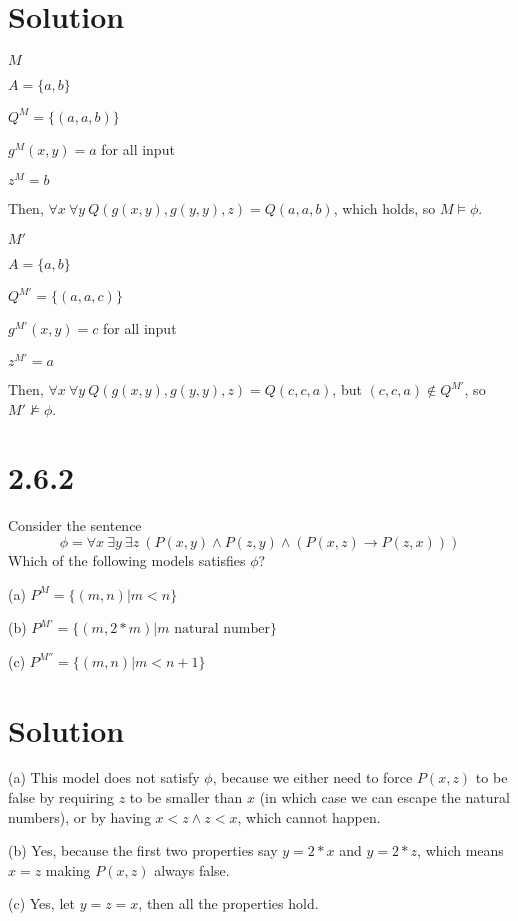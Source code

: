 \documentclass[10pt]{article}
\begin{document}
\section*{Solution}
\begin{description*}
\item $M$
\item $A = \{a,b\}$
\item $Q^{M} = \{(a,a,b)\}$
\item $g^{M}(x,y) = a$ for all input
\item $z^{M} = b$
\end{description*}
Then, $\forall x\ \forall y\ Q(g(x,y),g(y,y),z)=Q(a,a,b)$, which holds, so $M \models \phi$.
\begin{description*}
\item $M'$
\item $A = \{a,b\}$
\item $Q^{M'} = \{(a,a,c)\}$
\item $g^{M'}(x,y) = c$ for all input
\item $z^{M'} = a$
\end{description*}
Then, $\forall x\ \forall y\ Q(g(x,y),g(y,y),z) = Q(c,c,a)$, but $(c,c,a) \not \in Q^{M'}$, so $M' \not \models \phi$.
\section*{2.6.2}
Consider the sentence
\[
\phi = \forall x\ \exists y\ \exists z\ (P(x,y)\land P(z,y) \land (P(x,z)\to P(z,x)))
\]
Which of the following models satisfies $\phi$?
\begin{description*}
\item[(a)] $P^M = \{ (m,n) | m < n \}$
\item[(b)] $P^{M'} = \{ (m,2*m) | m \text{ natural number} \}$ 
\item[(c)] $P^{M''} = \{ (m,n) | m < n + 1\}$
\end{description*}
\section*{Solution}
\begin{description*}
\item[(a)] This model does not satisfy $\phi$, because we either need to force $P(x,z)$ to be false by requiring $z$ to be smaller than $x$ (in which case we can escape the natural numbers), or by having $x<z \land z<x$, which cannot happen.
\item[(b)] Yes, because the first two properties say $y=2*x$ and $y=2*z$, which means $x=z$ making $P(x,z)$ always false.
\item[(c)] Yes, let $y=z=x$, then all the properties hold.
\end{description*}
\end{document}

